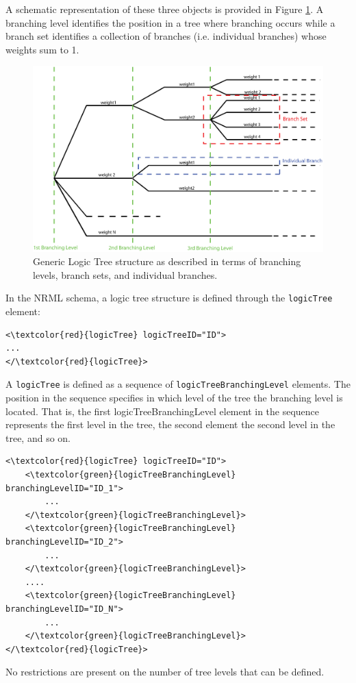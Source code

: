 A schematic representation of these three objects is provided in Figure 
\ref{glts}. A branching level identifies the position in a tree where
branching occurs while a branch set identifies a collection of branches 
(i.e. individual branches) whose weights sum to 1.\\
%
\begin{figure}[!h]
\centering
\includegraphics[width=15cm]{./figures/hazard/GenericLogicTreeStructure.eps}
\caption{Generic Logic Tree structure as described in terms of branching 
levels, branch sets, and individual branches.}
\label{glts}
\end{figure}
%
In the NRML schema, a logic tree structure is defined through the 
\Verb+logicTree+ element: 
%
\begin{Verbatim}[frame=single, commandchars=\\\{\}]
<\textcolor{red}{logicTree} logicTreeID="ID">
...
</\textcolor{red}{logicTree}>
\end{Verbatim}
%
A \Verb+logicTree+ is defined as a sequence of \Verb+logicTreeBranchingLevel+ 
elements. The position in the sequence specifies in which level of the tree 
the branching level is located. That is, the first logicTreeBranchingLevel 
element in the sequence represents the first level in the tree, the second 
element the second level in the tree, and so on.
%
\begin{Verbatim}[frame=single, commandchars=\\\{\}]
<\textcolor{red}{logicTree} logicTreeID="ID">
	<\textcolor{green}{logicTreeBranchingLevel} branchingLevelID="ID_1">
		...
	</\textcolor{green}{logicTreeBranchingLevel}>
	<\textcolor{green}{logicTreeBranchingLevel} branchingLevelID="ID_2">
		...
	</\textcolor{green}{logicTreeBranchingLevel}>
	....
	<\textcolor{green}{logicTreeBranchingLevel} branchingLevelID="ID_N">
		...
	</\textcolor{green}{logicTreeBranchingLevel}>
</\textcolor{red}{logicTree}>
\end{Verbatim}
No restrictions are present on the number of tree levels that can 
be defined.

